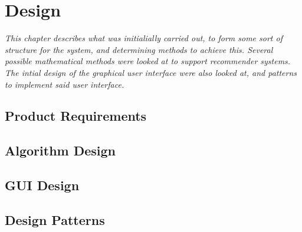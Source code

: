 \chapter{Design}

\textit{This chapter describes what was initialially carried out, to form some sort of structure for the system, and determining methods to achieve this. Several possible mathematical methods were looked at to support recommender systems. The intial design of the graphical user interface were also looked at, and patterns to implement said user interface.}

\section{Product Requirements}
\label{Requirements}

\section{Algorithm Design}
\label{AlgDes}

\section{GUI Design}
\label{GUIDes}

\section{Design Patterns}
\label{DesPatterns}
